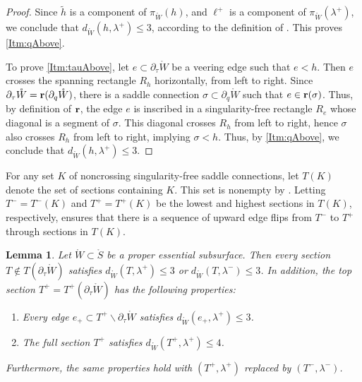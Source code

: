\documentclass[11pt,letterpaper]{amsart}
\newcommand{\wt}{\widetilde}
\newcommand{\mr}{\mathring}
\newcommand{\bdy}{\partial} %
\newcommand{\psub}{\mr W}
\numberwithin{equation}{section}
\newtheorem{lemma}[theorem]{Lemma}
\theoremstyle{definition}
\renewcommand{\setminus}{\smallsetminus}
\renewcommand{\r}{{\bf r}}
\begin{document}
\begin{proof}

Since $\widetilde h$ is a component of $\pi_{\psub}(h)$, and $\ell^+$ is a component of $\pi_{\psub}(\lambda^+)$, we conclude that $d_{\psub}(h,\lambda^+) \leq 3$, 
according to the definition of .
This proves \eqref{Itm:qAbove}.

To prove \eqref{Itm:tauAbove}, let $e \subset \bdy_\tau \psub$ be a veering edge such that $e < h$. Then $e$ crosses the spanning rectangle $R_h$  horizontally, from left to right. Since $\bdy_\tau \psub = \r(\bdy_q \psub)$, there is a saddle connection $\sigma \subset \bdy_q \psub$ such that $e \in \r(\sigma)$. Thus, by definition of $\r$, the edge $e$ is inscribed in a singularity-free rectangle $R_e$ whose diagonal is a segment of $\sigma$. This diagonal crosses $R_h$ from left to right, hence $\sigma$ also crosses $R_h$ from left to right, implying  $\sigma < h$. Thus, by \eqref{Itm:qAbove}, we conclude that $d_{\psub}(h,\lambda^+) \leq 3$.
\end{proof}


For any set $K$ of noncrossing singularity-free saddle connections, let $T(K)$ denote the set of sections containing $K$. 
This set is nonempty by \cite[Lemma 3.2]{MinskyTaylor:FiberedFaces}. Letting $T^- = T^-(K)$ and $T^+ = T^+(K)$ be the lowest and highest sections in $T(K)$, respectively, \cite[Proposition 3.3]{MinskyTaylor:FiberedFaces} ensures that there is a sequence of upward edge flips from $T^-$ to $T^+$ through sections in $T(K)$. 

\begin{lemma}\label{Lem:TopOfPocket}
Let $\psub \subset \mr S$ be a proper essential subsurface. Then every section $T \notin T(\bdy_\tau \psub)$ satisfies $d_{\psub}(T, \lambda^+) \leq 3$ or $d_{\psub}(T, \lambda^-) \leq 3$.
In addition, the top section $T^+ = T^+(\bdy_\tau \psub)$ has the following properties:
\begin{enumerate}
\item Every edge $e_+ \subset T^+ \setminus \bdy_\tau \psub$ satisfies $d_{\psub}(e_+, \lambda^+) \leq 3$.
\item The full section $T^+$ satisfies $d_{\psub}(T^+, \lambda^+) \leq 4$.
\end{enumerate}
Furthermore, the same properties hold with $(T^+, \lambda^+)$ replaced by $(T^-, \lambda^-)$.
\end{lemma}
\end{document}
